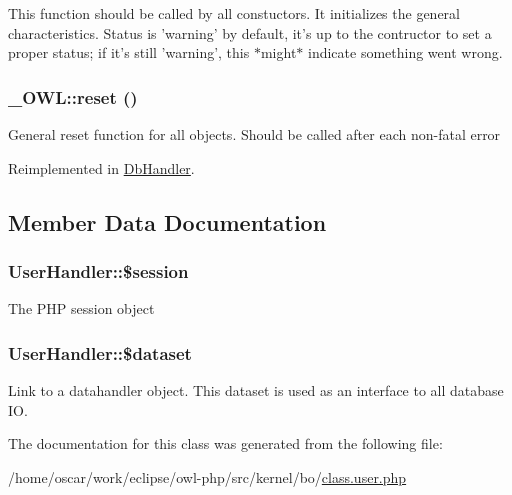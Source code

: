 This function should be called by all constuctors. It initializes the general characteristics. Status is 'warning' by default, it's up to the contructor to set a proper status; if it's still 'warning', this $\ast$might$\ast$ indicate something went wrong. \hypertarget{class__OWL_2f2a042bcf31965194c03033df0edc9b}{
\subsubsection{\setlength{\rightskip}{0pt plus 5cm}\_\-OWL::reset ()}}
\label{class__OWL_2f2a042bcf31965194c03033df0edc9b}


General reset function for all objects. Should be called after each non-fatal error 

Reimplemented in \hyperlink{classDbHandler_9982df4830f05803935bb31bac7fae3d}{DbHandler}.

\subsection{Member Data Documentation}
\hypertarget{classUserHandler_f097b7fd1ee085b46a6c34e071508a7f}{
\subsubsection{\setlength{\rightskip}{0pt plus 5cm}UserHandler::\$session}}
\label{classUserHandler_f097b7fd1ee085b46a6c34e071508a7f}


The PHP session object \hypertarget{classUserHandler_c38c1ea50b2820ed03781bdbe8eb2e08}{
\subsubsection{\setlength{\rightskip}{0pt plus 5cm}UserHandler::\$dataset}}
\label{classUserHandler_c38c1ea50b2820ed03781bdbe8eb2e08}


Link to a datahandler object. This dataset is used as an interface to all database IO. 

The documentation for this class was generated from the following file:\begin{CompactItemize}
\item 
/home/oscar/work/eclipse/owl-php/src/kernel/bo/\hyperlink{class_8user_8php}{class.user.php}\end{CompactItemize}
